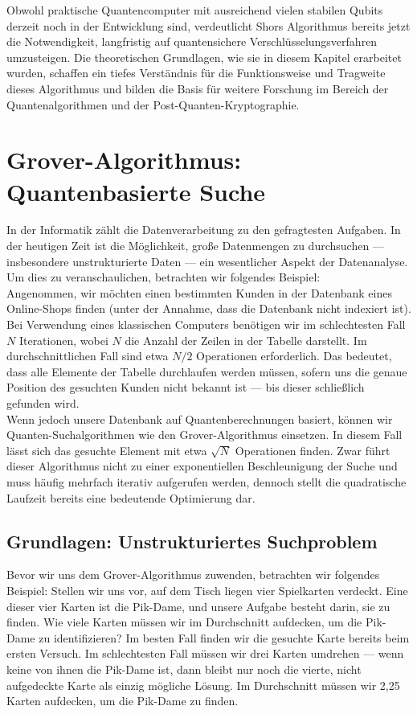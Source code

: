 Obwohl praktische Quantencomputer mit ausreichend vielen stabilen Qubits derzeit noch in der Entwicklung sind, verdeutlicht Shors Algorithmus bereits jetzt die Notwendigkeit, langfristig auf quantensichere Verschlüsselungsverfahren umzusteigen. Die theoretischen Grundlagen, wie sie in diesem Kapitel erarbeitet wurden, schaffen ein tiefes Verständnis für die Funktionsweise und Tragweite dieses Algorithmus und bilden die Basis für weitere Forschung im Bereich der Quantenalgorithmen und der Post-Quanten-Kryptographie.

\section{Grover-Algorithmus: Quantenbasierte Suche}
\label{sec:grover-algorithm}
In der Informatik zählt die Datenverarbeitung zu den gefragtesten Aufgaben. In der heutigen Zeit ist die Möglichkeit, große Datenmengen zu durchsuchen — insbesondere unstrukturierte Daten — ein wesentlicher Aspekt der Datenanalyse. Um dies zu veranschaulichen, betrachten wir folgendes Beispiel:\\ 

Angenommen, wir möchten einen bestimmten Kunden in der Datenbank eines Online-Shops finden (unter der Annahme, dass die Datenbank nicht indexiert ist). Bei Verwendung eines klassischen Computers benötigen wir im schlechtesten Fall $N$ Iterationen, wobei $N$ die Anzahl der Zeilen in der Tabelle darstellt. Im durchschnittlichen Fall sind etwa $N/2$ Operationen erforderlich. Das bedeutet, dass alle Elemente der Tabelle durchlaufen werden müssen, sofern uns die genaue Position des gesuchten Kunden nicht bekannt ist — bis dieser schließlich gefunden wird.\\

Wenn jedoch unsere Datenbank auf Quantenberechnungen basiert, können wir Quanten-Suchalgorithmen wie den Grover-Algorithmus einsetzen. In diesem Fall lässt sich das gesuchte Element mit etwa $\sqrt{N}$ Operationen finden. Zwar führt dieser Algorithmus nicht zu einer exponentiellen Beschleunigung der Suche und muss häufig mehrfach iterativ aufgerufen werden, dennoch stellt die quadratische Laufzeit bereits eine bedeutende Optimierung dar.

\subsection{Grundlagen: Unstrukturiertes Suchproblem}
Bevor wir uns dem Grover-Algorithmus zuwenden, betrachten wir folgendes Beispiel: Stellen wir uns vor, auf dem Tisch liegen vier Spielkarten verdeckt. Eine dieser vier Karten ist die Pik-Dame, und unsere Aufgabe besteht darin, sie zu finden. Wie viele Karten müssen wir im Durchschnitt aufdecken, um die Pik-Dame zu identifizieren? Im besten Fall finden wir die gesuchte Karte bereits beim ersten Versuch. Im schlechtesten Fall müssen wir drei Karten umdrehen — wenn keine von ihnen die Pik-Dame ist, dann bleibt nur noch die vierte, nicht aufgedeckte Karte als einzig mögliche Lösung. Im Durchschnitt müssen wir 2{,}25 Karten aufdecken, um die Pik-Dame zu finden.\\

